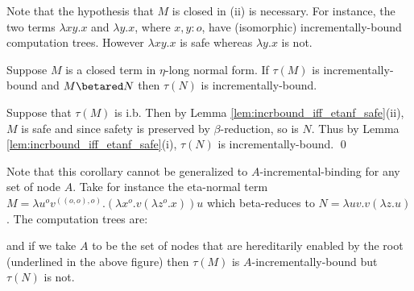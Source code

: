 Note that the hypothesis that $M$ is closed in (ii) is necessary.
For instance, the two terms $\lambda x y .x$ and $\lambda y . x$,
where $x,y:o$, have (isomorphic) incrementally-bound computation
trees. However $\lambda x y .x$ is safe whereas $\lambda y . x$ is
not.

\begin{corollary}
\label{cor:betared_preserve_incrbound} Suppose $M$ is a closed term
in $\eta$-long normal form. If $\tau(M)$ is incrementally-bound and
$M \betared N$ then $\tau(N)$ is incrementally-bound.
\end{corollary}
\proof Suppose that $\tau(M)$ is i.b. Then by Lemma
\ref{lem:incrbound_iff_etanf_safe}(ii), $M$ is safe and since safety
is preserved by $\beta$-reduction, so is $N$. Thus by Lemma
\ref{lem:incrbound_iff_etanf_safe}(i), $\tau(N)$ is
incrementally-bound. \qed
\smallskip

Note that this corollary  cannot be generalized to
$A$-incremental-binding for any set of node $A$. Take for instance
the eta-normal term $M = \lambda u^{o} v^{((o,o),o)} . (\lambda x^o
. v (\lambda z^o . x)) u$ which beta-reduces to $N = \lambda u v . v
(\lambda z . u)$. The computation trees are:
\begin{center}
\end{center}
and if we take $A$ to be the set of nodes that are hereditarily enabled by
the root (underlined in the above figure) then $\tau(M)$
is $A$-incrementally-bound but $\tau(N)$ is not.



